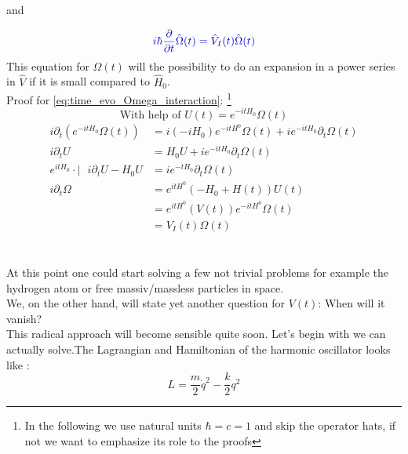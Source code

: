 \documentclass[12pt, titlepage]{article}
\newcommand{\RM}[1]{\MakeUppercase{\romannumeral #1}}
\begin{document}
and

\begin{equation}\label{eq:time_evo_Omega_interaction}
\textcolor[RGB]{0,0,204}{
	i\hbar
	\frac{\partial}{\partial t}
	\hat{\Omega}(t)
	=
	\hat{V}_{I}(t)
	\hat{\Omega}(t)
}
\end{equation}
This equation for $ \Omega(t) $ will the possibility to do an expansion in a power series in $ \hat{V} $ if it is small compared to $ \hat{H}_{0} $.
\\Proof \RM{2} for \eqref{eq:time_evo_Omega_interaction}:
\footnote{In the following we use natural units $ \hbar=c=1 $
and skip the operator hats, if not we want to emphasize its role to the proofs}
\begin{equation}\label{eq:Omega_and_U}
 	\textrm{With help of }
 	U(t)
 	=
 	e^{-itH_{0}}
	\Omega(t)  
 \end{equation} 
\begin{equation*}
\begin{aligned}\label{eq:proof_omega_eq}
	i
	\partial_{t}
	(e^{-itH_{0}}
	\Omega(t))
		&=
		i(-iH_{0}) e^{-itH^{0}} \Omega(t)
		+
		ie^{-itH_{0}} \partial_{t} \Omega(t)
		\\
			i\partial_{t} U
			&=H_{0}U+ie^{-itH_{0}}\partial_{t}\Omega(t)
			\\
				e^{itH_{0}} \cdot	| \textrm{     }
				i\partial_{t} U - H_{0} U
				&=i e^{-tH_{0}} \partial_{t}\Omega(t)				
					\\					
					   i\partial_{t}	\Omega
						&=e^{itH^{0}} (-H_{0} + H(t)) U(t)
						\\
						   &=e^{itH^{0}} (V(t)) e^{-itH^{0}} 										\Omega(t)
						   \\
						   	  &=V_{I}(t) \Omega(t)		
\end{aligned}
\end{equation*}
\\\\
At this point one could start solving a few not trivial problems for example the hydrogen atom or free massiv/massless particles in space. \\
We, on the other hand, will state yet another question for $ V(t) $: When will it vanish?\\
This radical approach will become sensible quite soon. Let's begin with we can actually solve.The Lagrangian and Hamiltonian of the harmonic oscillator looks like :
\begin{equation}\label{eq:Lagr_Harm_class}
 L=\frac{m}{2} \dot{q}^{2}-\frac{k}{2} q^{2}
 \end{equation} 
\end{document}
